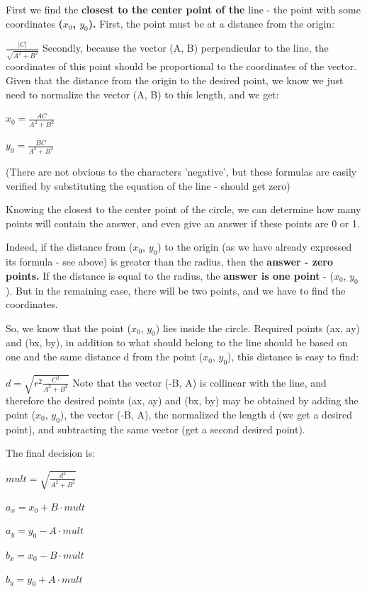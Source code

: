 First we find the \textbf{closest to the center point of the} line - the point with some coordinates \textbf{($x_0$, $y_0$).} First, the point must be at a distance from the origin:

$\frac{|C|}{\sqrt{A^{2}+B^{2}}}$
Secondly, because the vector (A, B) perpendicular to the line, the coordinates of this point should be proportional to the coordinates of the vector. Given that the distance from the origin to the desired point, we know we just need to normalize the vector (A, B) to this length, and we get:

$x_{0}=\frac{AC}{A^{2}+B^{2}}$

$y_{0}=\frac{BC}{A^{2}+B^{2}}$

(There are not obvious to the characters 'negative', but these formulas are easily verified by substituting the equation of the line - should get zero)

Knowing the closest to the center point of the circle, we can determine how many points will contain the answer, and even give an answer if these points are 0 or 1.

Indeed, if the distance from ($x_0$, $y_0$) to the origin (as we have already expressed its formula - see above) is greater than the radius, then the \textbf{answer - zero points.} If the distance is equal to the radius, the \textbf{answer is one point} - ($x_0$, $y_0$). But in the remaining case, there will be two points, and we have to find the coordinates.

So, we know that the point ($x_0$, $y_0$) lies inside the circle. Required points (ax, ay) and (bx, by), in addition to what should belong to the line should be based on one and the same distance d from the point ($x_0$, $y_0$), this distance is easy to find:

$d=\sqrt{r^{2}\frac{C^{2}}{A^{2}+B^{2}}}$
Note that the vector (-B, A) is collinear with the line, and therefore the desired points (ax, ay) and (bx, by) may be obtained by adding the point ($x_0$, $y_0$), the vector (-B, A), the normalized the length d (we get a desired point), and subtracting the same vector (get a second desired point).

The final decision is:

$mult=\sqrt{\frac{d^{2}}{A^{2}+B^{2}}}$

$a_{x}=x_{0}+B\cdot mult$

$a_{y}=y_{0}-A\cdot mult$

$b_{x}=x_{0}-B\cdot mult$

$b_{y}=y_{0}+A\cdot mult$

